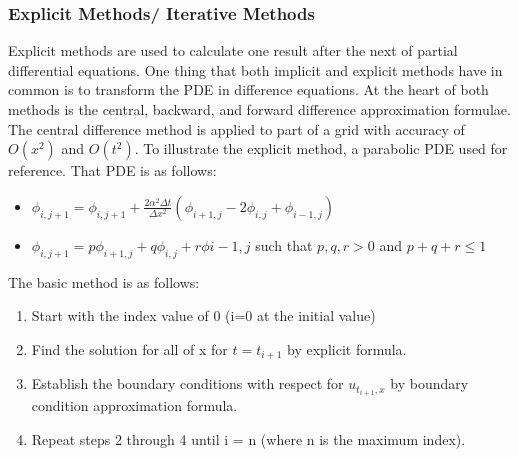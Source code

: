 \documentclass[11pt]{article}
\begin{document}
\subsubsection {Explicit Methods/ Iterative Methods}
Explicit methods are used to calculate one result after the next of partial differential equations.  One thing that both implicit and explicit methods have in common is to transform the PDE in difference equations.  At the heart of both methods is the central, backward, and forward difference approximation formulae.  The central difference method is applied to part of a grid with accuracy of $O(x^2)$ and $O(t^2)$.  To illustrate the explicit method, a parabolic PDE used for reference.  That PDE is as follows: %
\begin{itemize}
\item $\phi _{i,j+1} = \phi _{i,j+1} + \frac{2\alpha^2 \Delta t} {\Delta x^2}  (\phi _{i+1,j} -2 \phi _{i,j} + \phi _{i-1,j})   $
\item $\phi _{i,j+1} = p \phi _{i+1,j} + q \phi _{i,j} + r \phi {i-1,j} $ such that $p,q,r > 0$ and $ p + q + r \le 1$
\end{itemize}




The basic method is as follows:
\begin{enumerate}
\item Start with the index value of 0 (i=0 at the initial value)
\item Find the solution for all of x for $t=t_{i+1} $ by explicit formula.
\item Establish the boundary conditions with respect for $u_{t_{i+1} ,x}$ by boundary condition approximation formula.
\item Repeat steps 2 through 4 until i = n (where n is the maximum index).
\end{enumerate}

\end{document}
